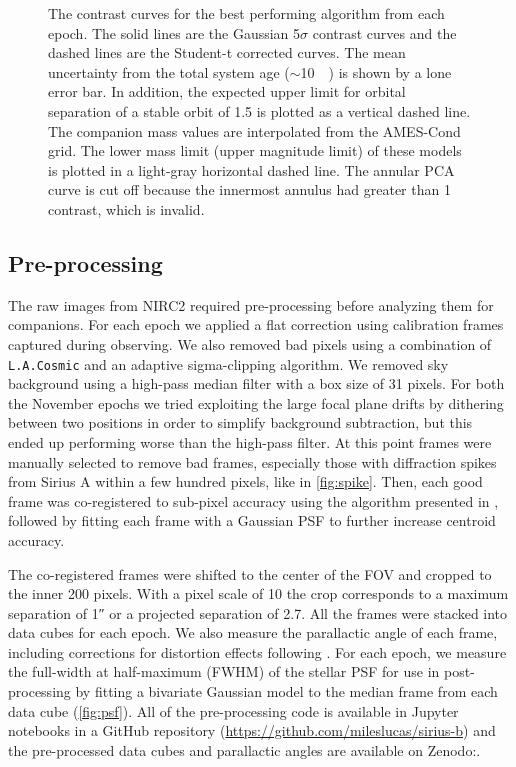 \documentclass[twocolumn]{aastex631}
\begin{document}
\begin{figure*}
    \centering
    \caption{The contrast curves for the best performing algorithm from each epoch. The solid lines are the Gaussian 5$\sigma$ contrast curves and the dashed lines are the Student-t corrected curves. The mean uncertainty from the total system age ($\sim$\qty{10}{\mega\year}) is shown by a lone error bar. In addition, the expected upper limit for orbital separation of a stable orbit of \qty{1.5}{\au} is plotted as a vertical dashed line. The companion mass values are interpolated from the AMES-Cond grid. The lower mass limit (upper magnitude limit) of these models is plotted in a light-gray horizontal dashed line. The annular PCA curve is cut off because the innermost annulus had greater than 1 contrast, which is invalid.}
    \label{fig:contrast}
\end{figure*}

\subsection{Pre-processing}

The raw images from NIRC2 required pre-processing before analyzing them for companions. For each epoch we applied a flat correction using calibration frames captured during observing. We also removed bad pixels using a combination of \texttt{L.A.Cosmic} \citep{van_dokkum_cosmic-ray_2001} and an adaptive sigma-clipping algorithm. We removed sky background using a high-pass median filter with a box size of 31 pixels. For both the November epochs we tried exploiting the large focal plane drifts by dithering between two positions in order to simplify background subtraction, but this ended up performing worse than the high-pass filter. At this point frames were manually selected to remove bad frames, especially those with diffraction spikes from Sirius A within a few hundred pixels, like in \cref{fig:spike}. Then, each good frame was co-registered to sub-pixel accuracy using the algorithm presented in \citet{guizar-sicairos_efficient_2008}, followed by fitting each frame with a Gaussian PSF to further increase centroid accuracy.

The co-registered frames were shifted to the center of the FOV and cropped to the inner 200 pixels. With a pixel scale of \qty{10}{\milliarcsecond} the crop corresponds to a maximum separation of \ang{;;1} or a projected separation of \qty{2.7}{\au}. All the frames were stacked into data cubes for each epoch. We also measure the parallactic angle of each frame, including corrections for distortion effects following \citet{yelda_improving_2010}. For each epoch, we measure the full-width at half-maximum (FWHM) of the stellar PSF for use in post-processing by fitting a bivariate Gaussian model to the median frame from each data cube (\cref{fig:psf}). All of the pre-processing code is available in Jupyter notebooks in a GitHub repository (\href{https://github.com/mileslucas/sirius-b}{https://github.com/mileslucas/sirius-b}) and the pre-processed data cubes and parallactic angles are available on Zenodo:.
\end{document}
